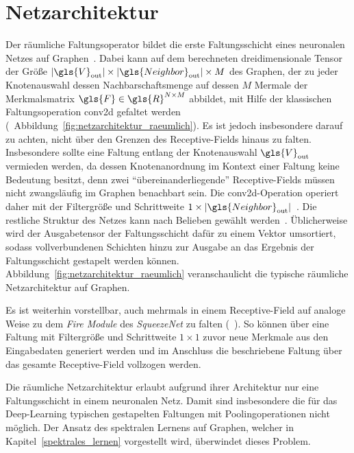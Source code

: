 \section{Netzarchitektur}
\label{raeumliche_netzarchitektur}

Der räumliche Faltungsoperator bildet die erste Faltungsschicht eines neuronalen Netzes auf Graphen~\cite{patchy}.
Dabei kann auf dem berechneten dreidimensionale Tensor der Größe $\left|\gls{V}_{\mathrm{out}}\right| \times \left|\gls{Neighbor}_{\mathrm{out}}\right| \times M$ des Graphen, der zu jeder Knotenauswahl dessen Nachbarschaftsmenge auf dessen $M$ Mermale der Merkmalsmatrix $\gls{F} \in \gls{R}^{N \times M}$ abbildet, mit Hilfe der klassischen Faltungsoperation \gls{conv2d} gefaltet werden (\vgl{}~Abbildung~\ref{fig:netzarchitektur_raeumlich}).
Es ist jedoch insbesondere darauf zu achten, nicht über den Grenzen des Receptive-Fields hinaus zu falten.
Insbesondere sollte eine Faltung entlang der Knotenauswahl $\gls{V}_{\mathrm{out}}$ vermieden werden, da dessen Knotenanordnung im Kontext einer Faltung keine Bedeutung besitzt, denn zwei \enquote{übereinanderliegende} Receptive-Fields müssen nicht zwangsläufig im Graphen benachbart sein.
Die \gls{conv2d}-Operation operiert daher mit der Filtergröße und Schrittweite $1 \times \left|\gls{Neighbor}_{\mathrm{out}}\right|$~\cite{patchy}.
Die restliche Struktur des Netzes kann nach Belieben gewählt werden~\cite{patchy}.
Üblicherweise wird der Ausgabetensor der Faltungsschicht dafür zu einem Vektor umsortiert, sodass vollverbundenen Schichten hinzu zur Ausgabe an das Ergebnis der Faltungsschicht gestapelt werden können.
Abbildung~\ref{fig:netzarchitektur_raeumlich} veranschaulicht die typische räumliche Netzarchitektur auf Graphen.


Es ist weiterhin vorstellbar, auch mehrmals in einem Receptive-Field auf analoge Weise zu dem \emph{Fire Module} des \emph{SqueezeNet} zu falten (\vgl{}~\cite{squeeze}).
So können \zB{} über eine Faltung mit Filtergröße und Schrittweite $1 \times 1$ zuvor neue Merkmale aus den Eingabedaten generiert werden und im Anschluss die beschriebene Faltung über das gesamte Receptive-Field vollzogen werden.

Die räumliche Netzarchitektur erlaubt aufgrund ihrer Architektur nur eine Faltungsschicht in einem neuronalen Netz.
Damit sind insbesondere die für das Deep-Learning typischen gestapelten Faltungen mit Poolingoperationen nicht möglich.
Der Ansatz des spektralen Lernens auf Graphen, welcher in Kapitel~\ref{spektrales_lernen} vorgestellt wird, überwindet dieses Problem.

